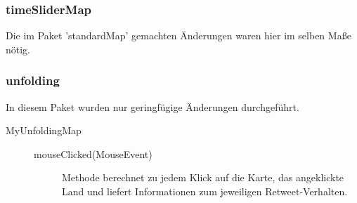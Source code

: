 		\subsubsection{timeSliderMap}
		Die im Paket 'standardMap' gemachten Änderungen waren hier im selben Maße nötig.
		\subsubsection{unfolding} 
		In diesem Paket wurden nur geringfügige Änderungen durchgeführt.
		\begin{description}
			\item[MyUnfoldingMap]
				\begin{description}
					\item[mouseClicked(MouseEvent)] Methode berechnet zu jedem Klick auf die Karte, das angeklickte Land und liefert Informationen zum jeweiligen Retweet-Verhalten.
				\end{description}
		\end{description}
	